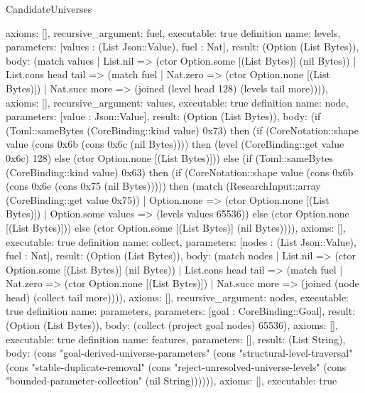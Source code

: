 \begin{lexlean}{CandidateUniverses}
\begin{semanticmodule}
{ axioms: [],
 recursive_argument: fuel,
 executable: true
}
definition{
 name: levels,
 parameters: [values : (List Json::Value), fuel : Nat],
 result: (Option (List Bytes)),
 body: (match values | List.nil => (ctor Option.some [(List Bytes)] (nil Bytes)) | List.cons head tail => (match fuel | Nat.zero => (ctor Option.none [(List Bytes)]) | Nat.succ more => (joined (level head 128) (levels tail more)))),
 axioms: [],
 recursive_argument: values,
 executable: true
}
definition{
 name: node,
 parameters: [value : Json::Value],
 result: (Option (List Bytes)),
 body: (if (Toml::sameBytes (CoreBinding::kind value) 0x73) then (if (CoreNotation::shape value (cons 0x6b (cons 0x6c (nil Bytes)))) then (level (CoreBinding::get value 0x6c) 128) else (ctor Option.none [(List Bytes)])) else (if (Toml::sameBytes (CoreBinding::kind value) 0x63) then (if (CoreNotation::shape value (cons 0x6b (cons 0x6e (cons 0x75 (nil Bytes))))) then (match (ResearchInput::array (CoreBinding::get value 0x75)) | Option.none => (ctor Option.none [(List Bytes)]) | Option.some values => (levels values 65536)) else (ctor Option.none [(List Bytes)])) else (ctor Option.some [(List Bytes)] (nil Bytes)))),
 axioms: [],
 executable: true
}
definition{
 name: collect,
 parameters: [nodes : (List Json::Value), fuel : Nat],
 result: (Option (List Bytes)),
 body: (match nodes | List.nil => (ctor Option.some [(List Bytes)] (nil Bytes)) | List.cons head tail => (match fuel | Nat.zero => (ctor Option.none [(List Bytes)]) | Nat.succ more => (joined (node head) (collect tail more)))),
 axioms: [],
 recursive_argument: nodes,
 executable: true
}
definition{
 name: parameters,
 parameters: [goal : CoreBinding::Goal],
 result: (Option (List Bytes)),
 body: (collect (project goal nodes) 65536),
 axioms: [],
 executable: true
}
definition{
 name: features,
 parameters: [],
 result: (List String),
 body: (cons "goal-derived-universe-parameters" (cons "structural-level-traversal" (cons "stable-duplicate-removal" (cons "reject-unresolved-universe-levels" (cons "bounded-parameter-collection" (nil String)))))),
 axioms: [],
 executable: true
}
\end{semanticmodule}
\end{lexlean}
